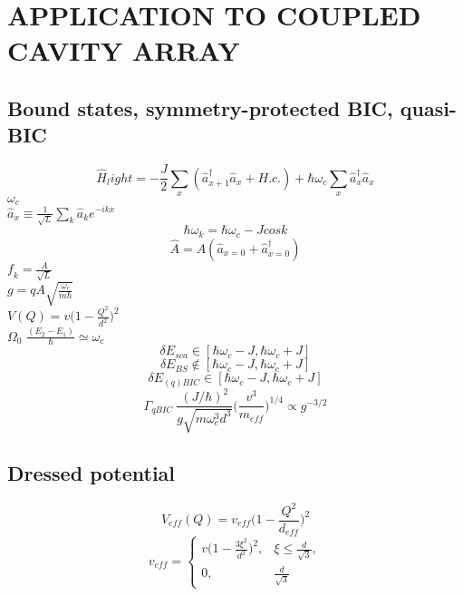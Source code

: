 \documentclass{article}
\begin{document}
\section*{APPLICATION TO COUPLED CAVITY ARRAY}
\subsection*{Bound states, symmetry-protected BIC, quasi-BIC}
\begin{equation*}
    \hat{H}_light = -\frac{J}{2} \sum_{x} (\hat{a}^\dagger_{x+1}\hat{a}_x + H.c.) + \hbar\omega_c \sum_{x} \hat{a}_x^\dagger \hat{a}_x
\end{equation*}
$\omega_c$ \\ $\hat{a}_x \equiv \frac{1}{\sqrt{L}} \sum_k \hat{a}_k e^{-ikx}$
\begin{equation*}
    \hbar\omega_k = \hbar\omega_c - J cos k
\end{equation*}
\begin{equation*}
    \hat{A}=\textit{A}(\hat{a}_{x=0} + \hat{a}_{x=0}^\dagger)
\end{equation*}
$\textit{f}_k=\frac{\textit{A}}{\sqrt{L}}$ \\
$g=q\textit{A}\sqrt{\frac{\omega_c}{m\hbar}}$\\
$V(Q) = v\big( 1-\frac{Q^2}{d^2}\big)^2$ \\
$\Omega_0$
$\frac{(E_2 - E_1)}{\hbar} \simeq \omega_c $\\
\begin{equation*}
    \delta E_{sca} \in [\hbar\omega_c - J , \hbar\omega_c + J]
\end{equation*}
\begin{equation*}
    \delta E_{BS} \notin [\hbar\omega_c - J , \hbar\omega_c + J]
\end{equation*}
\begin{equation*}
    \delta E_{(q)BIC} \in [\hbar\omega_c - J , \hbar\omega_c + J]
\end{equation*}
\begin{equation*}
    \Gamma_{qBIC} ~ \frac{(J/\hbar)^2}{g\sqrt{m\omega_c^3d^3}}\bigg(\frac{v^3}{m_{eff}}\bigg)^{1/4}
    \propto g^{-3/2}
\end{equation*}
\subsection*{Dressed potential}
\begin{equation*}
    V_{eff}(Q) = v_{eff}\bigg(1-\frac{Q^2}{d_{eff}}\bigg)^2
\end{equation*}
\begin{equation*}
    v_{eff}=\begin{cases}
        v\big(1-\frac{3\xi^2}{d^2}\big)^2, & \xi \leq \frac{d}{\sqrt{3}},\\
        0, & \frac{d}{\sqrt{3}}
    \end{cases}
\end{equation*}
\end{document}
